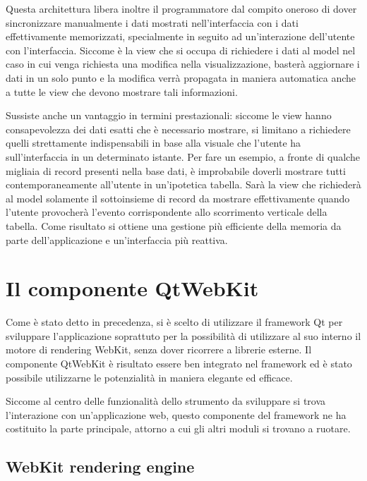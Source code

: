\documentclass[12pt]{toptesi}
\begin{document}
Questa architettura libera inoltre il programmatore dal compito oneroso di dover sincronizzare manualmente i dati mostrati nell'interfaccia con i dati effettivamente memorizzati, specialmente in seguito ad un'interazione dell'utente con l'interfaccia. Siccome è la view che si occupa di richiedere i dati al model nel caso in cui venga richiesta una modifica nella visualizzazione, basterà aggiornare i dati in un solo punto e la modifica verrà propagata in maniera automatica anche a tutte le view che devono mostrare tali informazioni. 

Sussiste anche un vantaggio in termini prestazionali: siccome le view hanno consapevolezza dei dati esatti che è necessario mostrare, si limitano a richiedere quelli strettamente indispensabili in base alla visuale che l'utente ha sull'interfaccia in un determinato istante. Per fare un esempio, a fronte di qualche migliaia di record presenti nella base dati, è improbabile doverli mostrare tutti contemporaneamente all'utente in un'ipotetica tabella. Sarà la view che richiederà al model solamente il sottoinsieme di record da mostrare effettivamente quando l'utente provocherà l'evento corrispondente allo scorrimento verticale della tabella. Come risultato si ottiene una gestione più efficiente della memoria da parte dell'applicazione e un'interfaccia più reattiva.


\section{Il componente QtWebKit}

Come è stato detto in precedenza, si è scelto di utilizzare il framework Qt per sviluppare l'applicazione soprattuto per la possibilità di utilizzare al suo interno il motore di rendering WebKit, senza dover ricorrere a librerie esterne. Il componente QtWebKit è risultato essere ben integrato nel framework ed è stato possibile utilizzarne le potenzialità in maniera elegante ed efficace.

Siccome al centro delle funzionalità dello strumento da sviluppare si trova l'interazione con un'applicazione web, questo componente del framework ne ha costituito la parte principale, attorno a cui gli altri moduli si trovano a ruotare.

\subsection{WebKit rendering engine}
\end{document}
